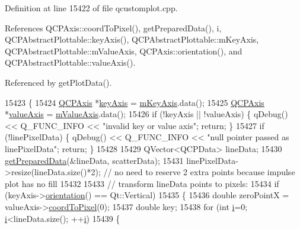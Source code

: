 Definition at line 15422 of file qcustomplot.\+cpp.



References Q\+C\+P\+Axis\+::coord\+To\+Pixel(), get\+Prepared\+Data(), i, Q\+C\+P\+Abstract\+Plottable\+::key\+Axis(), Q\+C\+P\+Abstract\+Plottable\+::m\+Key\+Axis, Q\+C\+P\+Abstract\+Plottable\+::m\+Value\+Axis, Q\+C\+P\+Axis\+::orientation(), and Q\+C\+P\+Abstract\+Plottable\+::value\+Axis().



Referenced by get\+Plot\+Data().


\begin{DoxyCode}
15423 \{
15424   \hyperlink{class_q_c_p_axis}{QCPAxis} *\hyperlink{class_q_c_p_abstract_plottable_a72c7a09c22963f2c943f07112b311103}{keyAxis} = \hyperlink{class_q_c_p_abstract_plottable_a426f42e254d0f8ce5436a868c61a6827}{mKeyAxis}.data();
15425   \hyperlink{class_q_c_p_axis}{QCPAxis} *\hyperlink{class_q_c_p_abstract_plottable_a3106f9d34d330a6097a8ec5905e5b519}{valueAxis} = \hyperlink{class_q_c_p_abstract_plottable_a2901452ca4aea911a1827717934a4bda}{mValueAxis}.data();
15426   \textcolor{keywordflow}{if} (!keyAxis || !valueAxis) \{ qDebug() << Q\_FUNC\_INFO << \textcolor{stringliteral}{"invalid key or value axis"}; \textcolor{keywordflow}{return}; \}
15427   \textcolor{keywordflow}{if} (!linePixelData) \{ qDebug() << Q\_FUNC\_INFO << \textcolor{stringliteral}{"null pointer passed as linePixelData"}; \textcolor{keywordflow}{return}; \}
15428   
15429   QVector<QCPData> lineData;
15430   \hyperlink{class_q_c_p_graph_ab420b46ba638dc3252439fe16687b244}{getPreparedData}(&lineData, scatterData);
15431   linePixelData->resize(lineData.size()*2); \textcolor{comment}{// no need to reserve 2 extra points because impulse plot has
       no fill}
15432   
15433   \textcolor{comment}{// transform lineData points to pixels:}
15434   \textcolor{keywordflow}{if} (keyAxis->\hyperlink{class_q_c_p_axis_a57483f2f60145ddc9e63f3af53959265}{orientation}() == Qt::Vertical)
15435   \{
15436     \textcolor{keywordtype}{double} zeroPointX = valueAxis->\hyperlink{class_q_c_p_axis_a985ae693b842fb0422b4390fe36d299a}{coordToPixel}(0);
15437     \textcolor{keywordtype}{double} key;
15438     \textcolor{keywordflow}{for} (\textcolor{keywordtype}{int} \hyperlink{_comparision_pictures_2_createtest_image_8m_a6f6ccfcf58b31cb6412107d9d5281426}{i}=0; \hyperlink{_comparision_pictures_2_createtest_image_8m_a6f6ccfcf58b31cb6412107d9d5281426}{i}<lineData.size(); ++\hyperlink{_comparision_pictures_2_createtest_image_8m_a6f6ccfcf58b31cb6412107d9d5281426}{i})
15439     \{

\end{DoxyCode}
